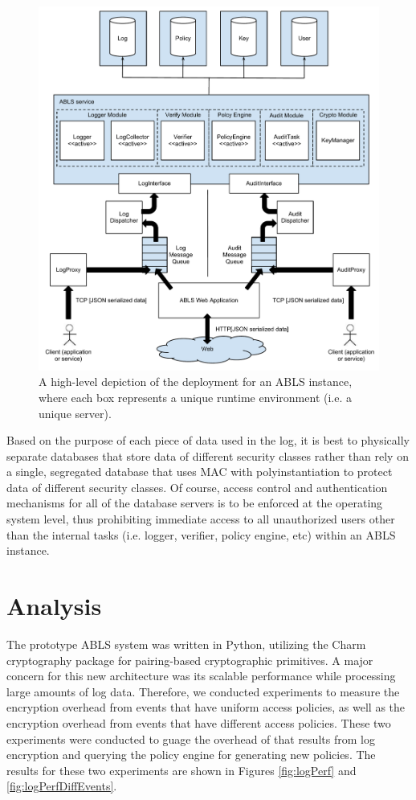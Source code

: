 \documentclass{sig-alternate}
\begin{document}
\begin{figure}[htb!]
\begin{center}
\includegraphics[width=5in]{images/deployment.pdf}
\caption{A high-level depiction of the deployment for an ABLS instance, where each box represents a unique runtime environment (i.e. a unique server).}
\label{fig:deployment}
\end{center}
\end{figure}

Based on the purpose of each piece of data used in the log, it is best to physically separate databases
that store data of different security classes rather than rely on a single, segregated database that uses MAC with 
polyinstantiation to protect data of different security classes. Of course, access control
and authentication mechanisms for all of the database servers is to be enforced at the operating system level, thus
prohibiting immediate access to all unauthorized users other than the internal tasks (i.e. logger, verifier, policy engine, etc) 
within an ABLS instance. 

\section{Analysis}
The prototype ABLS system was written in Python, utilizing the Charm cryptography package 
\cite{akinyelecharm} for pairing-based cryptographic primitives. A major concern for this new architecture 
was its scalable performance while processing large amounts of log data. Therefore, we conducted experiments
to measure the encryption overhead from events that have uniform access policies, as well as the
encryption overhead from events that have different access policies. These two experiments were conducted to
guage the overhead of that results from log encryption and querying the policy engine for generating new policies.
The results for these two experiments are shown in Figures \ref{fig:logPerf} and \ref{fig:logPerfDiffEvents}.
\end{document}
